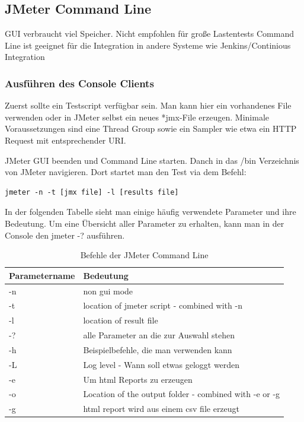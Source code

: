 \documentclass[a4paper,12pt]{article}
\begin{document}
\subsection{JMeter Command Line}
GUI verbraucht viel Speicher. Nicht empfohlen für große Lastentests
Command Line ist geeignet für die Integration in andere Systeme wie Jenkins/Continious Integration
\subsubsection{Ausführen des Console Clients}
Zuerst sollte ein Testscript verfügbar sein. Man kann hier ein vorhandenes File verwenden oder in JMeter selbst ein neues *jmx-File erzeugen. Minimale Voraussetzungen sind eine Thread Group sowie ein Sampler wie etwa ein HTTP Request mit entsprechender URI.

JMeter GUI beenden und Command Line starten. Danch in das /bin Verzeichnis von JMeter navigieren. Dort startet man den Test via dem Befehl:
\begin{lstlisting}[style=Cpp]
  jmeter -n -t [jmx file] -l [results file]
\end{lstlisting}
In der folgenden Tabelle sieht man einige häufig verwendete Parameter und ihre Bedeutung. Um eine Übersicht aller Parameter zu erhalten, kann man in der Console den jmeter -? ausführen.
\begin{table}[H]
	\centering
	\begin{tabular}{|l|l|}
		\hline
		\textbf{Parametername} & \textbf{Bedeutung} \\
		\hline
		-n & non gui mode \\
		-t & location of jmeter script - combined with -n \\
		-l & location of result file \\
		-? & alle Parameter an die zur Auswahl stehen \\
		-h & Beispielbefehle, die man verwenden kann \\
		-L & Log level - Wann soll etwas geloggt werden \\
		-e & Um html Reports zu erzeugen\\
		-o & Location of the output folder - combined with -e or -g \\
		-g & html report wird aus einem csv file erzeugt \\ 
		\hline
	\end{tabular}
	\caption[tab_parameter_non_gui]{Befehle der JMeter Command Line}
	\label{tab_parameter_non_gui}
\end{table}
\end{document}
